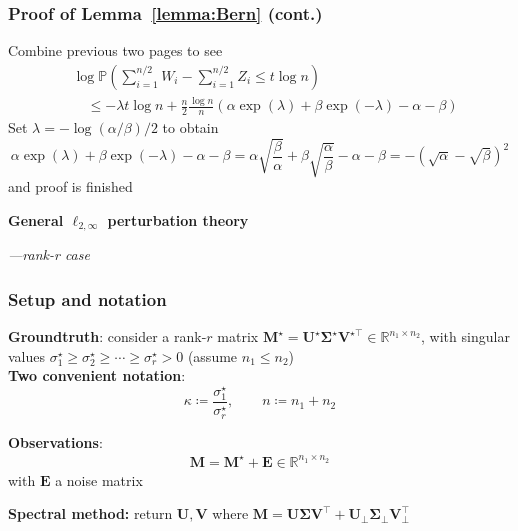 \documentclass[compress,
mathserif,wide,%
]{beamer}
\begin{document}
\begin{frame}
	\frametitle{Proof of Lemma~\ref{lemma:Bern} (cont.)}
	Combine previous two pages to see
\begin{align*}
& \log\mathbb{P}\left(\sum_{i=1}^{n/2}W_{i}-\sum_{i=1}^{n/2}Z_{i}\leq t\log n\right) \\
&\quad \leq-\lambda t\log n+\frac{n}{2}\frac{\log n}{n}\left(\alpha\exp\left(\lambda\right)+\beta\exp\left(-\lambda\right)-\alpha-\beta\right)
\end{align*}
Set $\lambda=-\log\left(\alpha/\beta\right)/2$ to obtain 
\[
\alpha\exp\left(\lambda\right)+\beta\exp\left(-\lambda\right)-\alpha-\beta=\alpha\sqrt{\frac{\beta}{\alpha}}+\beta\sqrt{\frac{\alpha}{\beta}}-\alpha-\beta=-\left(\sqrt{\alpha}-\sqrt{\beta}\right)^{2}
\]
and proof is finished 

\end{frame}


\begin{frame}[plain]
\vfill
\centering
{\Large \bf General $\ell_{2,\infty}$ perturbation theory}

{\hfill \large \em ---rank-r case}
\vfill
\end{frame}



\begin{frame}
	\frametitle{Setup and notation}
	{\bf Groundtruth}: consider a rank-$r$ matrix $\bm{M}^{\star} = \bm{U}^{\star}\bm{\Sigma}^{\star}\bm{V}^{\star\top} \in\mathbb{R}^{n_{1}\times n_{2}}$, with singular values $\sigma_{1}^{\star}\geq \sigma_{2}^{\star} \geq \cdots \geq \sigma_{r}^{\star} > 0$ (assume $n_1 \leq n_2$)  \\
	
	\vspace{1em}
	{\bf Two convenient notation}:
	\[
	\kappa \coloneqq \frac{\sigma_{1}^{\star}}{\sigma_{r}^{\star}}, \qquad n \coloneqq n_1 + n_2 
	\] 
	
	{\bf Observations}: 
	\begin{align*}
	\bm{M}=\bm{M}^{\star}+\bm{E} \in \mathbb{R}^{n_1 \times n_2}
\end{align*}
with $\bm{E}$ a  noise matrix
	
	\vspace{1em}
	{\bf Spectral method:} return $\bm{U}, \bm{V}$ where $\bm{M} = \bm{U} \bm{\Sigma} \bm{V}^\top + \bm{U}_{\perp} \bm{\Sigma}_{\perp} \bm{V}^\top_{\perp}$
\end{frame}
\end{document}
